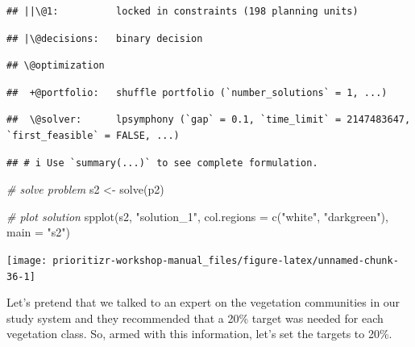 \documentclass[
  12pt,
]{book}
\newenvironment{Shaded}{\begin{snugshade}}{\end{snugshade}}
\newcommand{\AttributeTok}[1]{\textcolor[rgb]{0.77,0.63,0.00}{#1}}
\newcommand{\CommentTok}[1]{\textcolor[rgb]{0.56,0.35,0.01}{\textit{#1}}}
\newcommand{\FunctionTok}[1]{\textcolor[rgb]{0.00,0.00,0.00}{#1}}
\newcommand{\NormalTok}[1]{#1}
\newcommand{\OtherTok}[1]{\textcolor[rgb]{0.56,0.35,0.01}{#1}}
\newcommand{\StringTok}[1]{\textcolor[rgb]{0.31,0.60,0.02}{#1}}
\begin{document}
\begin{verbatim}
## ||\@1:          locked in constraints (198 planning units)
\end{verbatim}

\begin{verbatim}
## |\@decisions:   binary decision
\end{verbatim}

\begin{verbatim}
## \@optimization
\end{verbatim}

\begin{verbatim}
##  +@portfolio:   shuffle portfolio (`number_solutions` = 1, ...)
\end{verbatim}

\begin{verbatim}
##  \@solver:      lpsymphony (`gap` = 0.1, `time_limit` = 2147483647, `first_feasible` = FALSE, ...)
\end{verbatim}

\begin{verbatim}
## # i Use `summary(...)` to see complete formulation.
\end{verbatim}

\begin{Shaded}
\begin{Highlighting}[]
\CommentTok{\# solve problem}
\NormalTok{s2 }\OtherTok{\textless{}{-}} \FunctionTok{solve}\NormalTok{(p2)}

\CommentTok{\# plot solution}
\FunctionTok{spplot}\NormalTok{(s2, }\StringTok{"solution\_1"}\NormalTok{, }\AttributeTok{col.regions =} \FunctionTok{c}\NormalTok{(}\StringTok{"white"}\NormalTok{, }\StringTok{"darkgreen"}\NormalTok{), }\AttributeTok{main =} \StringTok{"s2"}\NormalTok{)}
\end{Highlighting}
\end{Shaded}

\begin{center}\texttt{[image: prioritizr-workshop-manual\_files/figure-latex/unnamed-chunk-36-1]} \end{center}

Let's pretend that we talked to an expert on the vegetation communities in our study system and they recommended that a 20\% target was needed for each vegetation class. So, armed with this information, let's set the targets to 20\%.
\end{document}
